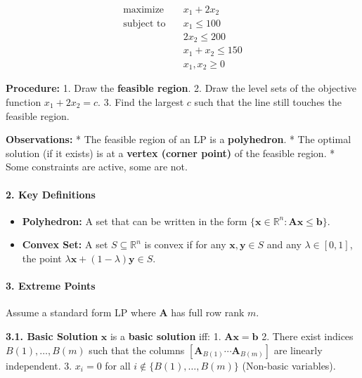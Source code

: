 \documentclass[11pt,a4paper]{article}
\providecommand{\tightlist}{\setlength{\itemsep}{0pt}\setlength{\parskip}{0pt}}
\begin{document}
\[
\begin{aligned}
\text{maximize} \quad & x_1 + 2x_2 \\
\text{subject to} \quad & x_1 \leq 100 \\
& 2x_2 \leq 200 \\
& x_1 + x_2 \leq 150 \\
& x_1, x_2 \geq 0
\end{aligned}
\]

\textbf{Procedure:} 1. Draw the \textbf{feasible region}. 2. Draw the level sets of the objective function \(x_1 + 2x_2 = c\). 3. Find the largest \(c\) such that the line still touches the feasible region.

\textbf{Observations:} * The feasible region of an LP is a \textbf{polyhedron}. * The optimal solution (if it exists) is at a \textbf{vertex (corner point)} of the feasible region. * Some constraints are active, some are not.

\paragraph{2. Key Definitions}\label{key-definitions}

\begin{itemize}
\tightlist
\item
  \textbf{Polyhedron:} A set that can be written in the form \(\{\boldsymbol{x} \in \mathbb{R}^n : \boldsymbol{A x} \leq \boldsymbol{b}\}\).
\item
  \textbf{Convex Set:} A set \(S \subseteq \mathbb{R}^n\) is convex if for any \(\boldsymbol{x}, \boldsymbol{y} \in S\) and any \(\lambda \in [0,1]\), the point \(\lambda \boldsymbol{x} + (1-\lambda) \boldsymbol{y} \in S\).
\end{itemize}

\paragraph{3. Extreme Points}\label{extreme-points}

Assume a standard form LP where \(\boldsymbol{A}\) has full row rank \(m\).

\textbf{3.1. Basic Solution} \(\boldsymbol{x}\) is a \textbf{basic solution} iff: 1. \(\boldsymbol{A x} = \boldsymbol{b}\) 2. There exist indices \(B(1), \dots, B(m)\) such that the columns \([\boldsymbol{A}_{B(1)} \cdots \boldsymbol{A}_{B(m)}]\) are linearly independent. 3. \(x_i = 0\) for all \(i \notin \{B(1), \dots, B(m)\}\) (Non-basic variables).
\end{document}
